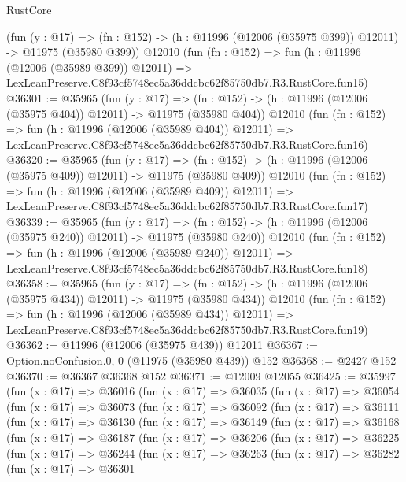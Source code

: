\begin{lexlean}{RustCore}
\begin{coremodule}
    (fun (y : @17) =>
    (fn : @152) -> (h : @11996 (@12006 (@35975 @399)) @12011) -> @11975 (@35980 @399))
    @12010
    (fun (fn : @152) =>
    fun (h : @11996 (@12006 (@35989 @399)) @12011) =>
    LexLeanPreserve.C8f93cf5748ec5a36ddcbc62f85750db7.R3.RustCore.fun15)
@36301 := @35965
    (fun (y : @17) =>
    (fn : @152) -> (h : @11996 (@12006 (@35975 @404)) @12011) -> @11975 (@35980 @404))
    @12010
    (fun (fn : @152) =>
    fun (h : @11996 (@12006 (@35989 @404)) @12011) =>
    LexLeanPreserve.C8f93cf5748ec5a36ddcbc62f85750db7.R3.RustCore.fun16)
@36320 := @35965
    (fun (y : @17) =>
    (fn : @152) -> (h : @11996 (@12006 (@35975 @409)) @12011) -> @11975 (@35980 @409))
    @12010
    (fun (fn : @152) =>
    fun (h : @11996 (@12006 (@35989 @409)) @12011) =>
    LexLeanPreserve.C8f93cf5748ec5a36ddcbc62f85750db7.R3.RustCore.fun17)
@36339 := @35965
    (fun (y : @17) =>
    (fn : @152) -> (h : @11996 (@12006 (@35975 @240)) @12011) -> @11975 (@35980 @240))
    @12010
    (fun (fn : @152) =>
    fun (h : @11996 (@12006 (@35989 @240)) @12011) =>
    LexLeanPreserve.C8f93cf5748ec5a36ddcbc62f85750db7.R3.RustCore.fun18)
@36358 := @35965
    (fun (y : @17) =>
    (fn : @152) -> (h : @11996 (@12006 (@35975 @434)) @12011) -> @11975 (@35980 @434))
    @12010
    (fun (fn : @152) =>
    fun (h : @11996 (@12006 (@35989 @434)) @12011) =>
    LexLeanPreserve.C8f93cf5748ec5a36ddcbc62f85750db7.R3.RustCore.fun19)
@36362 := @11996 (@12006 (@35975 @439)) @12011
@36367 := Option.noConfusion.{0, 0} (@11975 (@35980 @439)) @152
@36368 := @2427 @152
@36370 := @36367 @36368 @152
@36371 := @12009 @12055
@36425 := @35997
    (fun (x : @17) =>
    @36016
      (fun (x : @17) =>
      @36035
        (fun (x : @17) =>
        @36054
          (fun (x : @17) =>
          @36073
            (fun (x : @17) =>
            @36092
              (fun (x : @17) =>
              @36111
                (fun (x : @17) =>
                @36130
                  (fun (x : @17) =>
                  @36149
                    (fun (x : @17) =>
                    @36168
                      (fun (x : @17) =>
                      @36187
                        (fun (x : @17) =>
                        @36206
                          (fun (x : @17) =>
                          @36225
                            (fun (x : @17) =>
                            @36244
                              (fun (x : @17) =>
                              @36263
                                (fun (x : @17) =>
                                @36282
                                  (fun (x : @17) =>
                                  @36301

\end{coremodule}
\end{lexlean}
